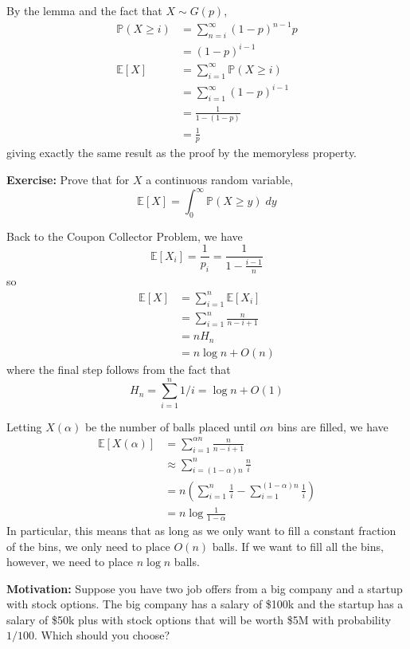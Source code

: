 \documentclass[12pt]{report}
\renewcommand{\P}{\mathbb{P}}
\newcommand{\E}{\mathbb{E}}
\newcommand*{\tbf}[1]{\ifmmode\mathbf{#1}\else\textbf{#1}\fi}
\newenvironment*{exercise}[1][red]{
    \begin{tcolorbox}[
        parbox=false,
        colback=#1!5!white,
        colframe=#1!75!black,
        breakable
    ]}
    {\end{tcolorbox}}
\begin{document}
By the lemma and the fact that $X \sim G(p)$, 
\begin{align*}
    \P(X \geq i) &= \sum_{n=i}^{\infty} (1-p)^{n-1} p\\
    &= (1 - p)^{i-1}\\ 
    \E[X] &= \sum_{i=1}^{\infty} \P(X \geq i)\\ 
    &= \sum_{i=1}^{\infty} (1 - p)^{i-1}\\
    &= \frac{1}{1 - (1-p)}\\
    &= \frac{1}{p}
\end{align*}
giving exactly the same result as the proof by the memoryless property.

\begin{exercise}
    \textbf{Exercise:} Prove that for $X$ a continuous random variable, 
    \[\E[X] = \int_0^{\infty} \P(X \geq y) \; dy\]
\end{exercise}

Back to the Coupon Collector Problem, we have
\[\E[X_i] = \frac{1}{p_i} = \frac{1}{1 - \frac{i-1}{n}}\]
so 
\begin{align*}
    \E[X] &= \sum_{i=1}^{n} \E[X_i]\\
    &= \sum_{i=1}^{n} \frac{n}{n - i + 1}\\
    &= nH_n\\
    &= n\log n + O(n)
\end{align*}
where the final step follows from the fact that 
\[H_n = \sum_{i=1}^{n} 1/i = \log n + O(1)\]

Letting $X(\alpha)$ be the number of balls placed until $\alpha n$ bins are filled, we have
\begin{align*}
    \E[X(\alpha)] &= \sum_{i=1}^{\alpha n} \frac{n}{n-i+1}\\ 
    &\approx \sum_{i=(1 - \alpha)n }^{n} \frac{n}{i}\\
    &= n\left(\sum_{i=1}^n \frac{1}{i} - \sum_{i=1}^{(1-\alpha)n} \frac{1}{i}\right)\\ 
    &= n\log \frac{1}{1 - \alpha} 
\end{align*}
In particular, this means that as long as we only want to fill a constant fraction of the bins, we only need to place $O(n)$ balls. If we want to fill all the bins, however, we need to place $n \log n$ balls.

\tbf{Motivation:} Suppose you have two job offers from a big company and a startup with stock options. The big company has a salary of \$100k and the startup has a salary of \$50k plus with stock options that will be worth \$5M with probability $1/100$. Which should you choose?
\end{document}
